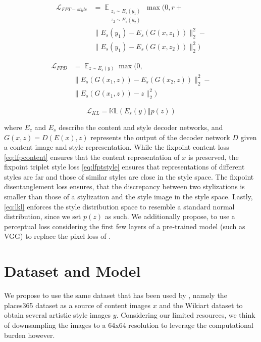 \documentclass[twoside,twocolumn]{article}
\begin{document}
\begin{equation}
\begin{split}
	\mathcal{L}_{FPT-style} & = \mathop{\mathbb{E}}_{\substack{z_1 \sim E_s(y_1) \\ z_2 \sim E_s(y_2)}}  \max(0, r + \\
	& \lVert E_s(y_1) - E_s(G(x, z_1))\rVert^2_2  - \\
	& \lVert E_s(y_1) - E_s(G(x, z_2))\rVert^2_2) 
\end{split}
\label{eq:lfptstyle}
\end{equation}

\begin{equation}
\begin{split}
\mathcal{L}_{FPD} & = \mathop{\mathbb{E}}_{z \sim E_s(y)} \max(0, \\ & 
\lVert E_s(G(x_1, z)) - E_s(G(x_2, z))\rVert^2_2 - \\ &
\lVert E_s(G(x_1, z)) - z \rVert^2_2)
\end{split}
\label{eq:lfdp}
\end{equation}

\begin{equation}
\mathcal{L}_{KL} = \mathbb{KL}(E_s(y) \Vert p(z))
\label{eq:lkl}
\end{equation}

where $E_c$ and $E_s$ describe the content and style decoder networks, and $G(x, z) = D(E(x), z)$ represents the output of the decoder network $D$ given a content image and style representation. While the fixpoint content loss \eqref{eq:lfpcontent} ensures that the content representation of $x$ is preserved, the fixpoint triplet style loss \eqref{eq:lfptstyle} ensures that representations of different styles are far and those of similar styles are close in the style space. The fixpoint disentanglement loss ensures, that the discrepancy between two stylizations is smaller than those of a stylization and the style image in the style space. Lastly, \eqref{eq:lkl} enforces the style distribution space to resemble a standard normal distribution, since we set $p(z)$ as such. We additionally propose, to use a perceptual loss considering the first few layers of a pre-trained model (such as VGG) to replace the pixel loss of \cite{Kotovenko_2019_ICCV}.

\section{Dataset and Model}

We propose to use the same dataset that has been used by \cite{Kotovenko_2019_ICCV}, namely the places365 dataset \cite{places365} as a source of content images $x$ and the Wikiart dataset \cite{wikiart} to obtain several artistic style images $y$. Considering our limited resources, we think of downsampling the images to a 64x64 resolution to leverage the computational burden however.
\end{document}
